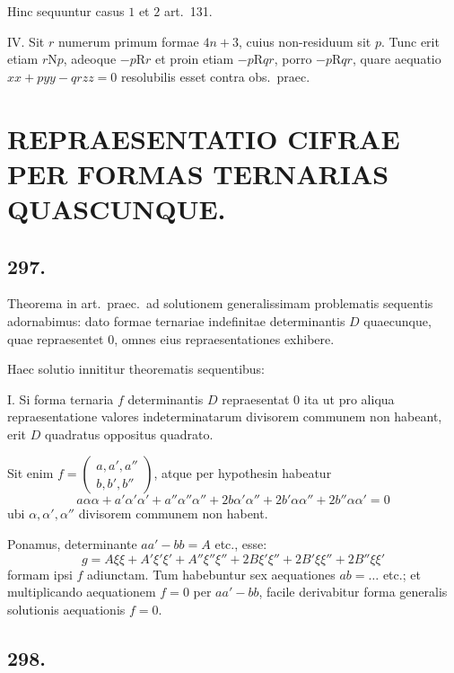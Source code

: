 \documentclass[12pt,a4paper]{article}
\theoremstyle{plain}
\theoremstyle{definition}
\theoremstyle{remark}
\begin{document}
Hinc sequuntur casus $1$ et $2$ art.\@~131.

\textsc{IV.} Sit $r$ numerum primum formae $4n+3$, cuius non-residuum sit
$p$. Tunc erit etiam $r \mathrel{\mathrm{N}} p$, adeoque $-p \mathrel{\mathrm{R}} r$ et proin etiam $-p \mathrel{\mathrm{R}} qr$,
porro $-p \mathrel{\mathrm{R}} qr$, quare aequatio $xx + pyy - qrzz = 0$ resolubilis esset contra
obs.\ praec.

\newpage

\section*{REPRAESENTATIO CIFRAE PER FORMAS TERNARIAS QUASCUNQUE.}

\subsection*{297.}

Theorema in art.\@~praec.\ ad solutionem generalissimam problematis sequentis
adornabimus: dato formae ternariae indefinitae determinantis $D$ quaecunque,
quae repraesentet $0$, omnes eius repraesentationes exhibere.

Haec solutio innititur theorematis sequentibus:

\textsc{I.} Si forma ternaria $f$ determinantis $D$ repraesentat $0$ ita ut pro
aliqua repraesentatione valores indeterminatarum divisorem communem non
habeant, erit $D$ quadratus oppositus quadrato.

Sit enim $f = \begin{pmatrix} a, a', a'' \\ b, b', b'' \end{pmatrix}$, atque per hypothesin habeatur
\[
a\alpha\alpha + a'\alpha'\alpha' + a''\alpha''\alpha'' + 2b\alpha'\alpha'' + 2b'\alpha\alpha'' + 2b''\alpha\alpha' = 0
\]
ubi $\alpha, \alpha', \alpha''$ divisorem communem non habent.

Ponamus, determinante $aa' - bb = A$ etc., esse:
\[
g = A\xi\xi + A'\xi'\xi' + A''\xi''\xi'' + 2B\xi'\xi'' + 2B'\xi\xi'' + 2B''\xi\xi'
\]
formam ipsi $f$ adiunctam. Tum habebuntur sex aequationes $ab = \ldots$ etc.;
et multiplicando aequationem $f = 0$ per $aa' - bb$, facile derivabitur forma
generalis solutionis aequationis $f = 0$.

\subsection*{298.}
\end{document}
